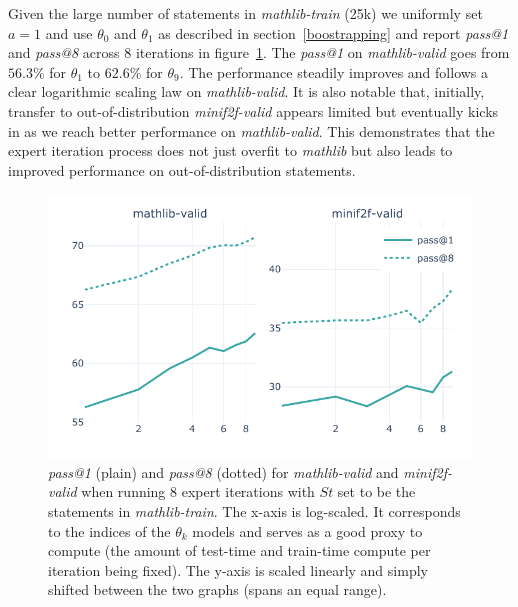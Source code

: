 \documentclass[nohyperref]{article}
\theoremstyle{plain}
\theoremstyle{definition}
\theoremstyle{remark}
\begin{document}
Given the large number of statements in \textit{mathlib-train} (25k) we uniformly set $a = 1$ and use $\theta_0$ and $\theta_1$ as described in section~\ref{boostrapping} and report \textit{pass@1} and \textit{pass@8} across 8 iterations in figure~\ref{fig:pp-mathlib-2}. The \textit{pass@1} on \textit{mathlib-valid} goes from $56.3 \%$ for $\theta_1$ to $62.6 \%$ for $\theta_9$. The performance steadily improves and follows a clear logarithmic scaling law on \textit{mathlib-valid}. It is also notable that, initially, transfer to out-of-distribution \textit{minif2f-valid} appears limited but eventually kicks in as we reach better performance on \textit{mathlib-valid}. This demonstrates that the expert iteration process does not just overfit to \textit{mathlib} but also leads to improved performance on out-of-distribution statements.

\begin{figure}[ht]
    \begin{center}
    \centerline{\includegraphics[width=\columnwidth]{figures/pp-mathlib-2.pdf}}
    \caption{\textit{pass@1} (plain) and \textit{pass@8} (dotted) for \textit{mathlib-valid} and \textit{minif2f-valid} when running 8 expert iterations with $\mathit{St}$ set to be the statements in \textit{mathlib-train}. The x-axis is log-scaled. It corresponds to the indices of the $\theta_k$ models and serves as a good proxy to compute (the amount of test-time and train-time compute per iteration being fixed). The y-axis is scaled linearly and simply shifted between the two graphs (spans an equal range).}
    \label{fig:pp-mathlib-2}
    \end{center}
\end{figure}
\end{document}
